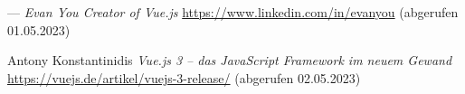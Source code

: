 \begin{thebibliography}{99}
	---
	\emph{Evan You Creator of Vue.js}
	\url{https://www.linkedin.com/in/evanyou}
	(abgerufen 01.05.2023)

	Antony Konstantinidis
	\emph{Vue.js 3 – das JavaScript Framework im neuem Gewand}
	\url{https://vuejs.de/artikel/vuejs-3-release/}
	(abgerufen 02.05.2023)


\end{thebibliography}

